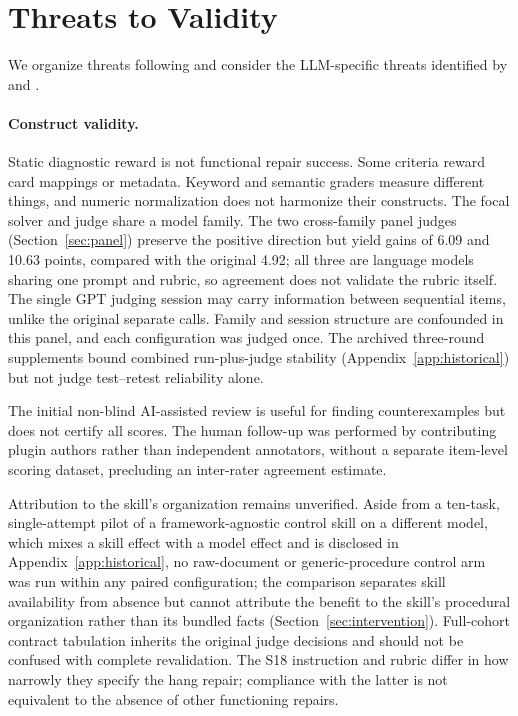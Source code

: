 \documentclass[11pt]{article}
\begin{document}
\section{Threats to Validity}\label{sec:threats}
We organize threats following \citet{wohlin2012experimentation} and consider the LLM-specific threats identified by \citet{sallou2024breaking} and \citet{wagner2025towards}.
\paragraph{Construct validity.}
Static diagnostic reward is not functional repair success. Some criteria reward card mappings or metadata. Keyword and semantic graders measure different things, and numeric normalization does not harmonize their constructs. The focal solver and judge share a model family. The two cross-family panel judges (Section~\ref{sec:panel}) preserve the positive direction but yield gains of 6.09 and 10.63 points, compared with the original 4.92; all three are language models sharing one prompt and rubric, so agreement does not validate the rubric itself. The single GPT judging session may carry information between sequential items, unlike the original separate calls. Family and session structure are confounded in this panel, and each configuration was judged once. The archived three-round supplements bound combined run-plus-judge stability (Appendix~\ref{app:historical}) but not judge test--retest reliability alone.

The initial non-blind AI-assisted review is useful for finding counterexamples but does not certify all scores. The human follow-up was performed by contributing plugin authors rather than independent annotators, without a separate item-level scoring dataset, precluding an inter-rater agreement estimate.

Attribution to the skill's organization remains unverified. Aside from a ten-task, single-attempt pilot of a framework-agnostic control skill on a different model, which mixes a skill effect with a model effect and is disclosed in Appendix~\ref{app:historical}, no raw-document or generic-procedure control arm was run within any paired configuration; the comparison separates skill availability from absence but cannot attribute the benefit to the skill's procedural organization rather than its bundled facts (Section~\ref{sec:intervention}). Full-cohort contract tabulation inherits the original judge decisions and should not be confused with complete revalidation. The S18 instruction and rubric differ in how narrowly they specify the hang repair; compliance with the latter is not equivalent to the absence of other functioning repairs.
\end{document}
